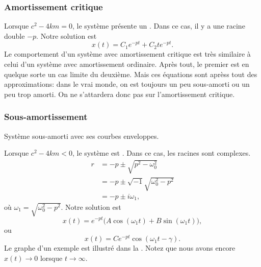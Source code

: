 \subsubsection{Amortissement critique}

Lorsque
$c^2 - 4km = 0$, le système présente un \emph{}.  Dans ce cas, il y a une racine double  $-p$.  Notre solution est 
\begin{equation*}
x(t) = C_1 e^{-pt} + C_2 t e^{-pt} .
\end{equation*}
Le comportement d'un système avec amortissement critique est très similaire à celui d'un système avec amortissement ordinaire. Après tout, le premier est en quelque sorte un cas limite du deuxième.  Mais ces équations sont aprèss tout des approximations: dans le vrai monde, on est toujours un peu sous-amorti ou un peu trop amorti. On ne s'attardera donc pas sur l'amortissement critique.

\subsubsection{Sous-amortissement}

\begin{mywrapfig}[13]{3.25in}
\capstart
{}
\caption{Système sous-amorti avec ses courbes enveloppes.\label{mv:underdampedfig}}
\end{mywrapfig}
%
%
Lorsque
$c^2 - 4km < 0$, le système est \emph{}.  Dans ce cas, les racines sont complexes. 
\begin{equation*}
\begin{split}
r & =
-p \pm \sqrt{p^2 - \omega_0^2} \\
& = 
-p \pm \sqrt{-1}\sqrt{\omega_0^2 - p^2} \\
& = 
-p \pm i \omega_1 ,
\end{split}
\end{equation*}
où $\omega_1 =\sqrt{\omega_0^2 - p^2}$.  Notre solution est
\begin{equation*}
x(t) = e^{-pt} \bigl( A \cos (\omega_1 t) + B \sin (\omega_1 t) \bigr) ,
\end{equation*}
ou
\begin{equation*}
x(t) = C e^{-pt} \cos ( \omega_1 t - \gamma ) .
\end{equation*}
Le graphe d'un exemple est illustré dans la  .  Notez que nous avons encore $x(t) \to 0$ lorsque $t \to \infty$.

